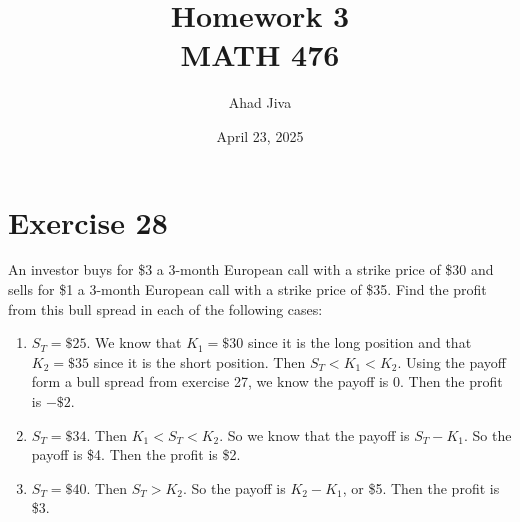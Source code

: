 \documentclass{article}
\title{Homework 3 \\ \large MATH 476}
\author{Ahad Jiva}
\date{April 23, 2025}
\begin{document}
\maketitle
\section*{Exercise 28} 
An investor buys for \$3 a 3-month European call with a strike price of \$30 and sells for \$1 a 3-month
European call with a strike price of \$35. Find the profit from this bull spread in each of the following cases:
\begin{enumerate}
    \item $S_T = \$25$. We know that $K_1 = \$30$ since it is the long position and that $K_2 = \$35$ since it is the short position.
    Then $S_T < K_1 < K_2$. Using the payoff form a bull spread from exercise 27, we know the payoff is 0. Then the profit is $-\$2$.
    \item $S_T = \$34$. Then $K_1 < S_T < K_2$. So we know that the payoff is $S_T - K_1$. So the payoff is \$4. Then the profit is \$2.
    \item $S_T = \$40$. Then $S_T > K_2$. So the payoff is $K_2 - K_1$, or \$5. Then the profit is \$3. 
\end{enumerate}
\end{document}
